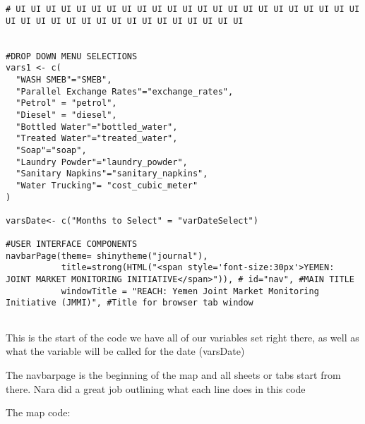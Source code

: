 \documentclass[
]{article}
\begin{document}
\begin{verbatim}
# UI UI UI UI UI UI UI UI UI UI UI UI UI UI UI UI UI UI UI UI UI UI UI UI UI UI UI UI UI UI UI UI UI UI UI UI UI UI UI


#DROP DOWN MENU SELECTIONS 
vars1 <- c(
  "WASH SMEB"="SMEB",
  "Parallel Exchange Rates"="exchange_rates",
  "Petrol" = "petrol",
  "Diesel" = "diesel",
  "Bottled Water"="bottled_water",
  "Treated Water"="treated_water",
  "Soap"="soap",
  "Laundry Powder"="laundry_powder",
  "Sanitary Napkins"="sanitary_napkins",
  "Water Trucking"= "cost_cubic_meter"
)

varsDate<- c("Months to Select" = "varDateSelect")

#USER INTERFACE COMPONENTS 
navbarPage(theme= shinytheme("journal"), 
           title=strong(HTML("<span style='font-size:30px'>YEMEN: JOINT MARKET MONITORING INITIATIVE</span>")), # id="nav", #MAIN TITLE
           windowTitle = "REACH: Yemen Joint Market Monitoring Initiative (JMMI)", #Title for browser tab window
           
\end{verbatim}

This is the start of the code we have all of our variables set right
there, as well as what the variable will be called for the date
(varsDate)

The navbarpage is the beginning of the map and all sheets or tabs start
from there. Nara did a great job outlining what each line does in this
code

The map code:
\end{document}
